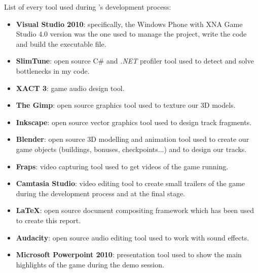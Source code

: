 
List of every tool used during \game's development process:

\begin{itemize}
	\item \textbf{Visual Studio 2010}: specifically, the Windows Phone with XNA
	Game Studio 4.0 version was the one used to manage the project, write the
	code and build the executable file.
	\item \textbf{SlimTune}: open source C\# and \textit{.NET} profiler tool
	used to detect and solve bottlenecks in my code.
	\item \textbf{XACT 3}: game audio design tool.
	\item \textbf{The Gimp}: open source graphics tool used to texture our
	3D models.
	\item \textbf{Inkscape}: open source vector graphics tool used to design
	track fragments.
	\item \textbf{Blender}: open source 3D modelling and animation tool used
	to create our game objects (buildings, bonuses, checkpoints...) and to
	design our tracks.
	\item \textbf{Fraps}: video capturing tool used to get videos of the game
	running.
	\item \textbf{Camtasia Studio}: video editing tool to create small trailers
	of the game during the development process and at the final stage.
	\item \textbf{\LaTeX}: open source document compositing framework which
	has been used to create this report.
	\item \textbf{Audacity}: open source audio editing tool used to work with
	sound effects.
	\item \textbf{Microsoft Powerpoint 2010}: presentation tool used to show
	the main highlights of the game during the demo session.
\end{itemize}